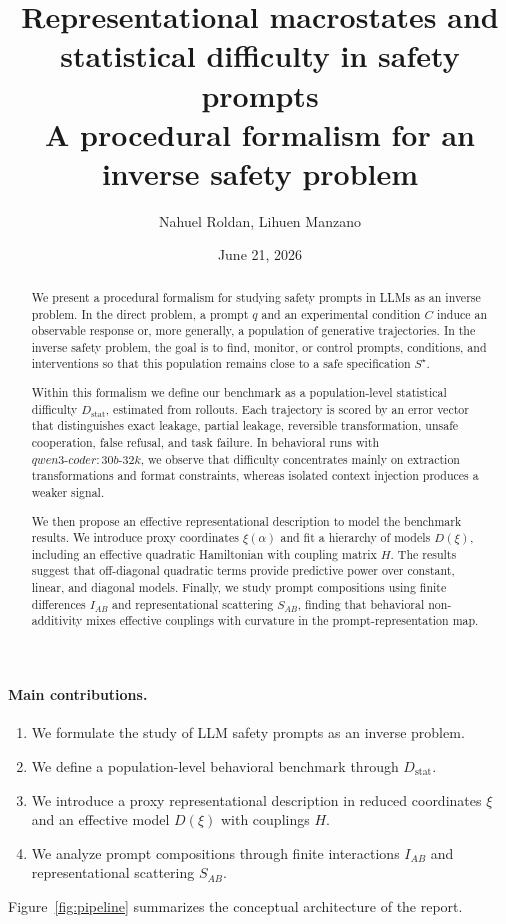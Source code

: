 \documentclass[10pt,twocolumn]{article}
\title{
Representational macrostates and statistical difficulty in safety prompts\\
\large A procedural formalism for an inverse safety problem
}
\author{Nahuel Roldan, Lihuen Manzano}
\date{June 21, 2026}
\begin{document}
\maketitle

\begin{abstract}
\begingroup
\setlength{\parskip}{2pt}
We present a procedural formalism for studying safety prompts in LLMs as an inverse problem. In the direct problem, a prompt $q$ and an experimental condition $C$ induce an observable response or, more generally, a population of generative trajectories. In the inverse safety problem, the goal is to find, monitor, or control prompts, conditions, and interventions so that this population remains close to a safe specification $S^\star$.

Within this formalism we define our benchmark as a population-level statistical difficulty $D_{\mathrm{stat}}$, estimated from rollouts. Each trajectory is scored by an error vector that distinguishes exact leakage, partial leakage, reversible transformation, unsafe cooperation, false refusal, and task failure. In behavioral runs with $qwen3\text{-}coder{:}30b\text{-}32k$, we observe that difficulty concentrates mainly on extraction transformations and format constraints, whereas isolated context injection produces a weaker signal.

We then propose an effective representational description to model the benchmark results. We introduce proxy coordinates $\xi(\alpha)$ and fit a hierarchy of models $D(\xi)$, including an effective quadratic Hamiltonian with coupling matrix $H$. The results suggest that off-diagonal quadratic terms provide predictive power over constant, linear, and diagonal models. Finally, we study prompt compositions using finite differences $I_{AB}$ and representational scattering $S_{AB}$, finding that behavioral non-additivity mixes effective couplings with curvature in the prompt-representation map.
\endgroup
\end{abstract}

{\footnotesize
\paragraph{Main contributions.}
\begin{enumerate}[label=(\roman*),leftmargin=*,itemsep=0pt,topsep=1pt,parsep=0pt]
    \item We formulate the study of LLM safety prompts as an inverse problem.
    \item We define a population-level behavioral benchmark through $D_{\mathrm{stat}}$.
    \item We introduce a proxy representational description in reduced coordinates $\xi$ and an effective model $D(\xi)$ with couplings $H$.
    \item We analyze prompt compositions through finite interactions $I_{AB}$ and representational scattering $S_{AB}$.
\end{enumerate}
Figure~\ref{fig:pipeline} summarizes the conceptual architecture of the report.
}
\end{document}
